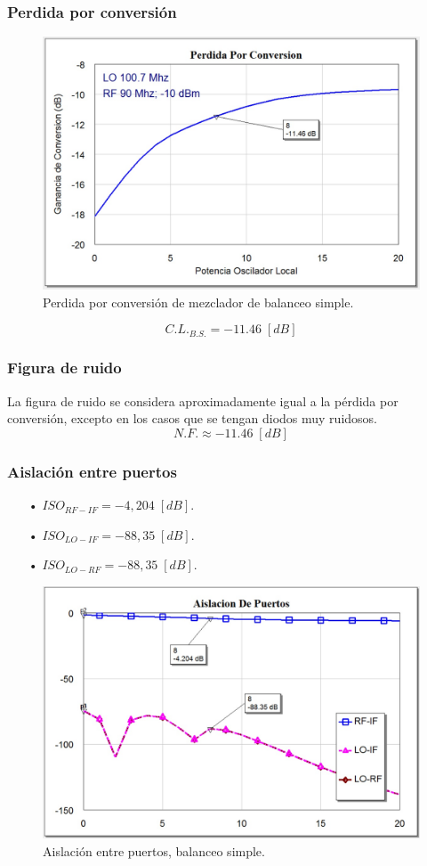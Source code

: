 \documentclass[twocolumn]{article}
\begin{document}
\subsubsection{Perdida por conversión}
%
\begin{figure}[h]
  \centering    
	\includegraphics[width=\columnwidth]{imagenes/CL2.jpg}
	\caption{Perdida por conversión de mezclador de balanceo simple.}\label{fig:CL2}
\end{figure}
\[C.L._{B.S.} = -11.46 \; [dB] \]
%
\subsubsection{Figura de ruido}
%
La figura de ruido se considera aproximadamente igual a la pérdida por conversión, excepto en los casos que se tengan diodos muy ruidosos.
\[N.F. \approx -11.46 \; [dB] \]
%
\subsubsection{Aislación entre puertos}
%
\begin{itemize}\itemsep0em
\item[•]  $ISO_{RF-IF} = -4,204 \; [dB]$.
\item[•]  $ISO_{LO-IF} = -88,35 \; [dB]$.
\item[•]  $ISO_{LO-RF} = -88,35 \; [dB]$.
\end{itemize}
%
\begin{figure}[h!]
  \centering    
	\includegraphics[scale=0.3]{imagenes/ISO2.jpg}
	\caption{Aislación entre puertos, balanceo simple.}\label{fig:ISO2}
\end{figure}
\clearpage
%
\end{document}
